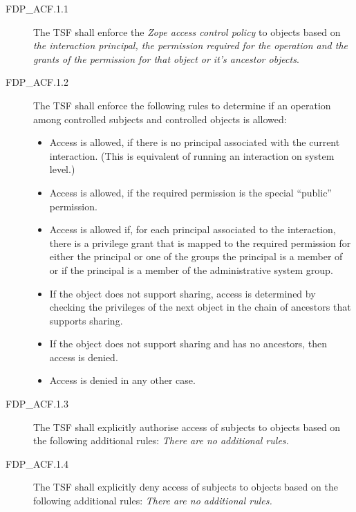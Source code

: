 \documentclass[12pt,english]{scrbook}
\begin{document}
\begin{description}
\item[FDP{\_}ACF.1.1]

The TSF shall enforce the \emph{Zope access control policy} to objects
based on \emph{the interaction principal, the permission required for
the operation and the grants of the permission for that
object or it's ancestor objects}.

\item[FDP{\_}ACF.1.2]

The TSF shall enforce the following rules to determine
if an operation among controlled subjects and controlled objects is
allowed:

\begin{itemize}

\item Access is allowed, if there is no principal associated with the current
interaction. (This is equivalent of running an interaction on system level.)

\item Access is allowed, if the required permission is the special ``public''
permission.

\item Access is allowed if, for each principal associated to the interaction,
there is a privilege grant that is mapped to the required permission for either
the principal or one of the groups the principal is a member of or if the principal is a member
of the administrative system group.

\item If the object does not support sharing, access is determined by checking
the privileges of the next object in the chain of ancestors that supports
sharing. 

\item If the object does not support sharing and has no ancestors, then access
is denied.

\item Access is denied in any other case.

\end{itemize}

\item[FDP{\_}ACF.1.3]

The TSF shall explicitly authorise access of subjects to objects based on the
following additional rules: \emph{There are no additional rules.}


\item[FDP{\_}ACF.1.4]

The TSF shall explicitly deny access of subjects to objects based on the
following additional rules: \emph{There are no additional rules.}


\end{description}
\end{document}
